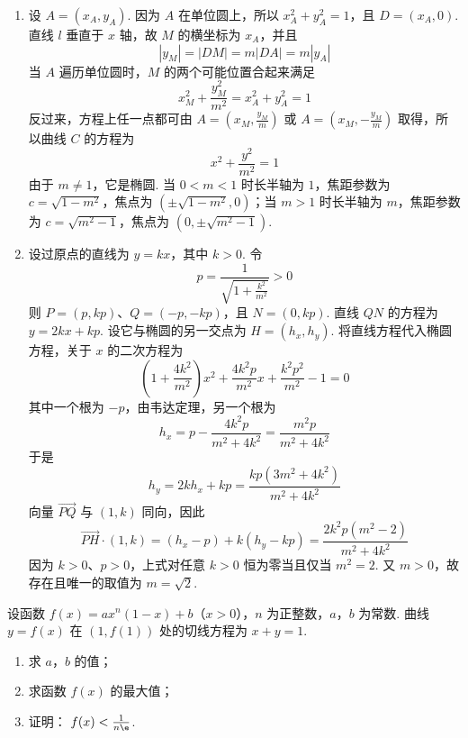 \begin{solution}
\begin{enumerate}
\item 设 \(A=(x_A,y_A)\). 因为 \(A\) 在单位圆上，所以 \(x_A^{2}+y_A^{2}=1\)，且 \(D=(x_A,0)\). 直线 \(l\) 垂直于 \(x\) 轴，故 \(M\) 的横坐标为 \(x_A\)，并且
\[
|y_M|=|DM|=m|DA|=m|y_A|
\]
当 \(A\) 遍历单位圆时，\(M\) 的两个可能位置合起来满足
\[
x_M^{2}+\frac{y_M^{2}}{m^{2}}=x_A^{2}+y_A^{2}=1
\]
反过来，方程上任一点都可由 \(A=(x_M,\frac{y_M}{m})\) 或 \(A=(x_M,-\frac{y_M}{m})\) 取得，所以曲线 \(C\) 的方程为
\[
x^{2}+\frac{y^{2}}{m^{2}}=1
\]
由于 \(m\neq1\)，它是椭圆. 当 \(0<m<1\) 时长半轴为 \(1\)，焦距参数为 \(c=\sqrt{1-m^{2}}\)，焦点为 \(\left(\pm\sqrt{1-m^{2}},0\right)\)；当 \(m>1\) 时长半轴为 \(m\)，焦距参数为 \(c=\sqrt{m^{2}-1}\)，焦点为 \(\left(0,\pm\sqrt{m^{2}-1}\right)\).

\item 设过原点的直线为 \(y=kx\)，其中 \(k>0\). 令
\[
p=\frac1{\sqrt{1+\frac{k^{2}}{m^{2}}}}>0
\]
则 \(P=(p,kp)\)、\(Q=(-p,-kp)\)，且 \(N=(0,kp)\). 直线 \(QN\) 的方程为 \(y=2kx+kp\). 设它与椭圆的另一交点为 \(H=(h_x,h_y)\). 将直线方程代入椭圆方程，关于 \(x\) 的二次方程为
\[
\left(1+\frac{4k^{2}}{m^{2}}\right)x^{2}+\frac{4k^{2}p}{m^{2}}x+\frac{k^{2}p^{2}}{m^{2}}-1=0
\]
其中一个根为 \(-p\)，由韦达定理，另一个根为
\[
h_x=p-\frac{4k^{2}p}{m^{2}+4k^{2}}=\frac{m^{2}p}{m^{2}+4k^{2}}
\]
于是
\[
h_y=2kh_x+kp=\frac{kp(3m^{2}+4k^{2})}{m^{2}+4k^{2}}
\]
向量 \(\overrightarrow{PQ}\) 与 \((1,k)\) 同向，因此
\[
\overrightarrow{PH}\cdot(1,k)
=(h_x-p)+k(h_y-kp)
=\frac{2k^{2}p(m^{2}-2)}{m^{2}+4k^{2}}
\]
因为 \(k>0\)、\(p>0\)，上式对任意 \(k>0\) 恒为零当且仅当 \(m^{2}=2\). 又 \(m>0\)，故存在且唯一的取值为 \(m=\sqrt2\).
\end{enumerate}
\end{solution}

\begin{problem}
设函数 \( f(x) = ax^n (1 - x) + b \)（\(x > 0\)），\( n \) 为正整数，\(a\)，\(b\) 为常数. 曲线 \( y = f(x) \) 在 \( (1, f(1)) \) 处的切线方程为 \( x + y = 1 \).
\begin{enumerate}
\item 求 \(a\)，\(b\) 的值；
\item 求函数 \( f(x) \) 的最大值；
\item 证明： \( f(x) < \frac{1}{n\e} \).
\end{enumerate}
\end{problem}

